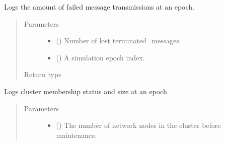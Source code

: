 \documentclass[letterpaper,10pt,english]{sphinxmanual}
\begin{document}
\begin{fulllineitems}
\begin{fulllineitems}
\label{\detokenize{app.domain.helpers:app.domain.helpers.smart_dataclasses.LoggingData.log_lost_messages}}
Logs the amount of failed message transmissions at an epoch.
\begin{quote}\begin{description}
\item[{Parameters}] \leavevmode\begin{itemize}
\item {} 
 () \textendash{} Number of lost terminated\_messages.

\item {} 
 () \textendash{} A simulation epoch index.

\end{itemize}

\item[{Return type}] \leavevmode
{}

\end{description}\end{quote}

\end{fulllineitems}


\begin{fulllineitems}
\label{\detokenize{app.domain.helpers:app.domain.helpers.smart_dataclasses.LoggingData.log_maintenance}}
Logs cluster membership status and size at an epoch.
\begin{quote}\begin{description}
\item[{Parameters}] \leavevmode\begin{itemize}
\item {} 
 () \textendash{} The number of network nodes in the cluster before maintenance.


\end{itemize}
\end{description}
\end{quote}
\end{fulllineitems}
\end{fulllineitems}
\end{document}
